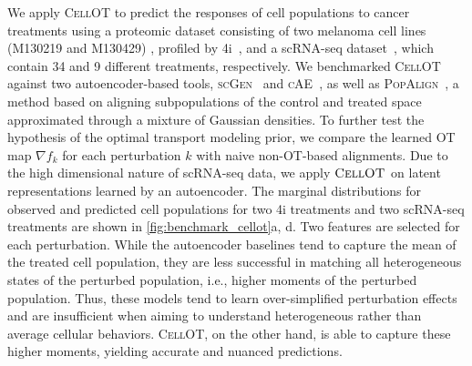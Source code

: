  We apply \textsc{CellOT} to predict the responses of cell populations to cancer treatments using a proteomic dataset consisting of two melanoma cell lines (M130219 and M130429) \citep{raaijmakers2015new}, profiled by 4i~\citep{gut2018multiplexed}, and a scRNA-seq dataset~\citep{srivatsan2020massively}, which contain 34 and 9 different treatments, respectively.
We benchmarked \textsc{CellOT} against two autoencoder-based tools, \textsc{scGen}~\citep{lotfollahi2019scgen} and \textsc{cAE}~\citep{lopez2018scvi}, as well as \textsc{PopAlign}~\citep{chen2020dissecting}, a method based on aligning subpopulations of the control and treated space approximated through a mixture of Gaussian densities.
To further test the hypothesis of the optimal transport modeling prior, we compare the learned OT map $\nabla f_k$ for each perturbation $k$ with naive non-OT-based alignments.
Due to the high dimensional nature of scRNA-seq data, we apply $\textsc{CellOT}$ on latent representations learned by an autoencoder.
The marginal distributions for observed and predicted cell populations for two 4i treatments and two scRNA-seq treatments are shown in \cref{fig:benchmark_cellot}a, d. 
Two features are selected for each perturbation.
While the autoencoder baselines tend to capture the mean of the treated cell population, they are less successful in matching all heterogeneous states of the perturbed population, i.e., higher moments of the perturbed population.
Thus, these models tend to learn over-simplified perturbation effects and are insufficient when aiming to understand heterogeneous rather than average cellular behaviors.
\textsc{CellOT}, on the other hand, is able to capture these higher moments, yielding accurate and nuanced predictions.

